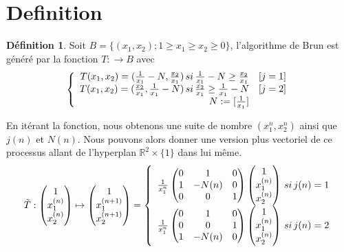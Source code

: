 \documentclass[12pt]{article}
\theoremstyle{plain}%
\theoremstyle{definition}
\newtheorem{dfnt}{Définition}[section]
\theoremstyle{remark}
\begin{document}
\section{Definition}

\begin{dfnt}
Soit $B=\{(x_1,x_2); 1 \geq x_1 \geq x_2 \geq 0\}$, l'algorithme de Brun est généré par la fonction $T: \to B$ avec
$$
\left \{
\begin{array}{r c }
T(x_1,x_2)=(\frac{1}{x_1}-N,\frac{x_2}{x_1}) \, si \, \frac{1}{x_1}-N \geq \frac{x_2}{x_1} & [j=1] \\
T(x_1,x_2)=(\frac{x_2}{x_1},\frac{1}{x_1}-N) \, si \, \frac{x_2}{x_1} \geq  \frac{1}{x_1}-N & [j=2] \\
N:=[\frac{1}{x_1}]
\end{array}
\right .
$$
\end{dfnt}
En itérant la fonction, nous obtenons une suite de nombre $(x_1^n,x_2^n)$ ainsi que $j(n)$ et $N(n)$.
Nous pouvons alors donner une version plus vectoriel de ce processus allant de l'hyperplan $\mathbb{R}^2 \times \{1 \} $ dans lui même.
$$
\tilde{T}:\begin{pmatrix} 1 \\ x_1^{(n)} \\ x_2^{(n)} \end{pmatrix} \mapsto \begin{pmatrix} 1 \\ x_1^{(n+1)} \\ x_2^{(n+1)} \end{pmatrix} = \left \{
\begin{array}{r c}
\frac{1}{x_1^n}\begin{pmatrix} 0 & 1 & 0 \\1 & -N(n) & 0 \\0 & 0& 1 \end{pmatrix} \begin{pmatrix} 1 \\ x_1^{(n)} \\ x_2^{(n)} \end{pmatrix} \, si \, j(n)=1\\
\frac{1}{x_1^n}\begin{pmatrix} 0 & 1 & 0 \\0 & 0 & 1 \\1 & -N(n) & 0 \end{pmatrix} \begin{pmatrix} 1 \\ x_1^{(n)} \\ x_2^{(n)} \end{pmatrix}\, si \, j(n)=2\\
\end{array}
\right .
$$
\end{document}
